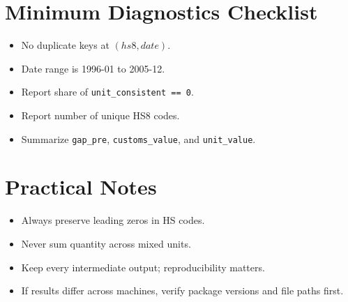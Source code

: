 \documentclass[11pt]{article}
\begin{document}
\section{Minimum Diagnostics Checklist}
\begin{itemize}[leftmargin=*]
  \item No duplicate keys at \((hs8, date)\).
  \item Date range is 1996-01 to 2005-12.
  \item Report share of \texttt{unit\_consistent == 0}.
  \item Report number of unique HS8 codes.
  \item Summarize \texttt{gap\_pre}, \texttt{customs\_value}, and \texttt{unit\_value}.
\end{itemize}

\section{Practical Notes}
\begin{itemize}[leftmargin=*]
  \item Always preserve leading zeros in HS codes.
  \item Never sum quantity across mixed units.
  \item Keep every intermediate output; reproducibility matters.
  \item If results differ across machines, verify package versions and file paths first.
\end{itemize}
\end{document}
